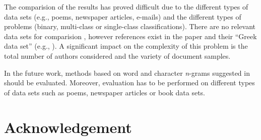 \documentclass{llncs}
\begin{document}
The comparision of the results has proved difficult due to the different types of data sets (e.g., poems,
newspaper articles, e-mails) and the different types of problems (binary, multi-class or
single-class classifications). There are no relevant data sets for comparision
\cite{zhao2005effective}, however references exist in the paper
\cite{stamatatos2001computer} and their ``Greek data set'' (e.g.,
\cite{keselj2003n}). A significant impact on the complexity of this problem 
is the total number of authors considered and the variety of document samples.

In the future work, methods based on word and character \emph{n}-grams suggested
in \cite{keselj2003n,peng2003language,coyotl2006authorship} should be
evaluated. Moreover, evaluation has to be performed on different types of data sets
such as poems, newspaper articles or book data sets.

\section*{Acknowledgement}



\end{document}

